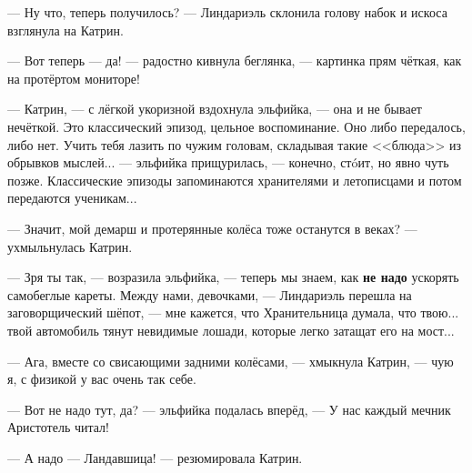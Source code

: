 --- Ну что, теперь получилось? --- Линдариэль склонила голову набок и искоса взглянула на Катрин.

--- Вот теперь --- да! --- радостно кивнула беглянка, --- картинка прям чёткая, как на протёртом мониторе!

--- Катрин, --- с лёгкой укоризной вздохнула эльфийка, --- она и не бывает нечёткой.
Это классический эпизод, цельное воспоминание. Оно либо передалось, либо нет.
Учить тебя лазить по чужим головам, складывая такие <<блюда>> из обрывков мыслей... ---
эльфийка прищурилась, --- конечно, ст\'oит, но явно чуть позже.
Классические эпизоды запоминаются хранителями и летописцами и потом передаются ученикам...

--- Значит, мой демарш и протерянные колёса тоже останутся в веках? --- ухмыльнулась Катрин.

--- Зря ты так, --- возразила эльфийка, --- теперь мы знаем, как \textbf{не надо} ускорять самобеглые кареты.
Между нами, девочками, --- Линдариэль перешла на заговорщический шёпот, --- мне кажется, что Хранительница думала,
что твою... твой автомобиль тянут невидимые лошади, которые легко затащат его на мост...

--- Ага, вместе со свисающими задними колёсами, --- хмыкнула Катрин, --- чую я, с физикой у вас очень так себе.

--- Вот не надо тут, да? --- эльфийка подалась вперёд, --- У нас каждый мечник Аристотель читал!

--- А надо --- Ландавшица! --- резюмировала Катрин.

\emptypar

\emptypar
